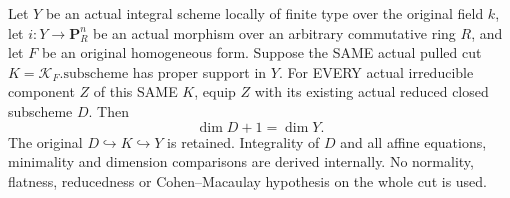 \begin{theorem}
\label{thm:pl-gauss-original-polynomial-cut-whole-component-dimension}
\leanok
Let $Y$ be an actual integral scheme locally of finite type over the
original field $k$, let $i:Y\to\mathbf P^n_R$ be an actual morphism
over an arbitrary commutative ring $R$, and let $F$ be an original
homogeneous form. Suppose the SAME actual pulled cut
$K=\mathcal K_F.\mathrm{subscheme}$ has proper support in $Y$.
For EVERY actual irreducible component $Z$ of this SAME $K$, equip
$Z$ with its existing actual reduced closed subscheme $D$. Then
\[
 \dim D+1=\dim Y.
\]
The original $D\hookrightarrow K\hookrightarrow Y$ is retained.
Integrality of $D$ and all affine equations, minimality and dimension
comparisons are derived internally. No normality, flatness,
reducedness or Cohen--Macaulay hypothesis on the whole cut is used.
\end{theorem}
